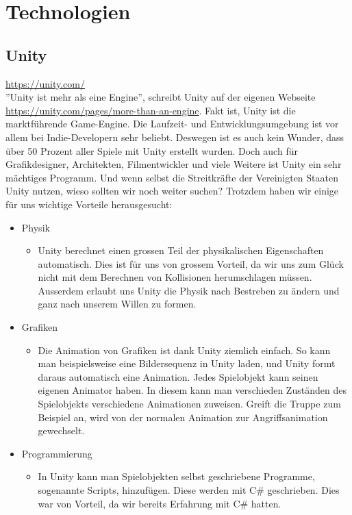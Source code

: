 \chapter{Technologien}

\section{Unity}
\url{https://unity.com/}\\
''Unity ist mehr als eine Engine'', schreibt Unity auf der eigenen Webseite \url{https://unity.com/pages/more-than-an-engine}. Fakt ist, Unity ist die marktführende Game-Engine. Die Laufzeit- und Entwicklungsumgebung 
ist vor allem bei Indie-Developern sehr beliebt. Deswegen ist es auch kein Wunder, dass über 50 Prozent aller Spiele mit Unity erstellt wurden. 
Doch auch für Grafikdesigner, Architekten, Filmentwickler und viele Weitere ist Unity ein sehr mächtiges Programm. Und wenn selbst die Streitkräfte der Vereinigten Staaten Unity nutzen, wieso sollten wir 
noch weiter suchen? Trotzdem haben wir einige für uns wichtige Vorteile herausgesucht:\\

\begin{itemize}
    \item Physik
    \begin{itemize}
        \item Unity berechnet einen grossen Teil der physikalischen Eigenschaften automatisch. Dies ist für uns von grossem Vorteil, da wir uns zum Glück nicht mit dem Berechnen von Kollisionen herumschlagen müssen.
        Ausserdem erlaubt uns Unity die Physik nach Bestreben zu ändern und ganz nach unserem Willen zu formen.
    \end{itemize}
    \item Grafiken
    \begin{itemize}
        \item Die Animation von Grafiken ist dank Unity ziemlich einfach. So kann man beispielsweise eine Bildersequenz in Unity laden, und Unity formt daraus automatisch eine Animation. Jedes Spielobjekt kann seinen
        eigenen Animator haben. In diesem kann man verschieden Zuständen des Spielobjekts verschiedene Animationen zuweisen. Greift die Truppe zum Beispiel an, wird von der normalen Animation zur Angriffsanimation
        gewechselt.
    \end{itemize}
    \item Programmierung
    \begin{itemize}
        \item In Unity kann man Spielobjekten selbst geschriebene Programme, sogenannte Scripts, hinzufügen. Diese werden mit C\# geschrieben. Dies war von Vorteil, da wir bereits Erfahrung mit C\# hatten. 
    \end{itemize}
\end{itemize}

